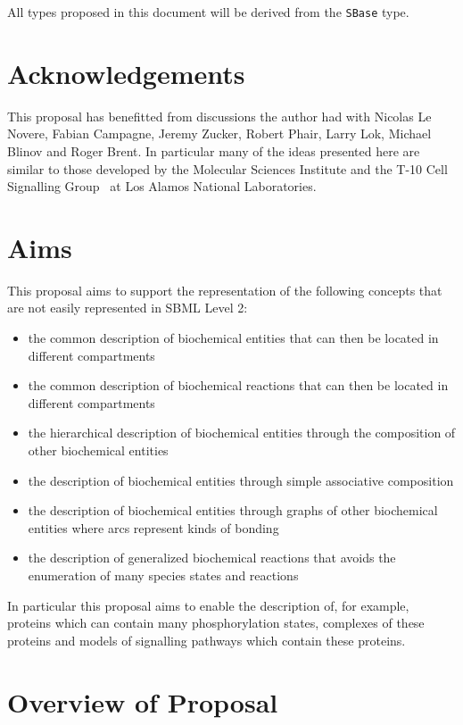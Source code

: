 \documentclass{cekarticle}
\begin{document}
All types proposed in this document will be derived from the
\texttt{SBase} type.


\section{Acknowledgements}

This proposal has benefitted from discussions the author had with Nicolas Le Novere,
Fabian Campagne, Jeremy Zucker, Robert Phair, Larry Lok, Michael Blinov and Roger Brent.
In particular many of the ideas presented here are similar to those developed by the Molecular
Sciences Institute and the T-10 Cell Signalling Group~\citep{goldstein:2001} at Los
Alamos National Laboratories.

\section{Aims}

This proposal aims to support the representation of the following concepts that are not easily
represented in SBML Level 2:

\begin{itemize}
\item the common description of biochemical entities that can then be located in different
compartments
\item the common description of biochemical reactions that can then be located in different
compartments
\item the hierarchical description of biochemical entities through the composition of other
biochemical entities
\item the description of biochemical entities through simple associative composition
\item the description of biochemical entities through graphs of other biochemical entities
where arcs represent kinds of bonding
\item the description of generalized biochemical reactions that avoids the enumeration of
many species states and reactions
\end{itemize}

In particular this proposal aims to enable the description of, for example, proteins which
can contain many phosphorylation states,
complexes of these proteins and models of signalling pathways which contain these proteins.

\section{Overview of Proposal}
\end{document}
